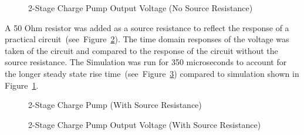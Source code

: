 \documentclass[12pt]{article}
\begin{document}
\begin{figure}[H]
\caption{2-Stage Charge Pump Output Voltage (No Source Resistance)}
\label{fig:2SCP NSR Out}
\end{figure}

\noindent A 50 Ohm resistor was added as a source resistance to reflect the response of a practical circuit~(see~Figure~\ref{fig:2SCP SR}). The time domain responses of the voltage was taken of the circuit and compared to the response of the circuit without the source resistance. The Simulation was run for 350 microseconds to account for the longer steady state rise time~(see~Figure~\ref{fig:2SCP SR Out}) compared to simulation shown in Figure~\ref{fig:2SCP NSR Out}.\\

\begin{figure}[H]
\caption{2-Stage Charge Pump (With Source Resistance)}
\label{fig:2SCP SR}
\end{figure}

\begin{figure}[H]
\caption{2-Stage Charge Pump Output Voltage (With Source Resistance)}
\label{fig:2SCP SR Out}
\end{figure}
\end{document}
